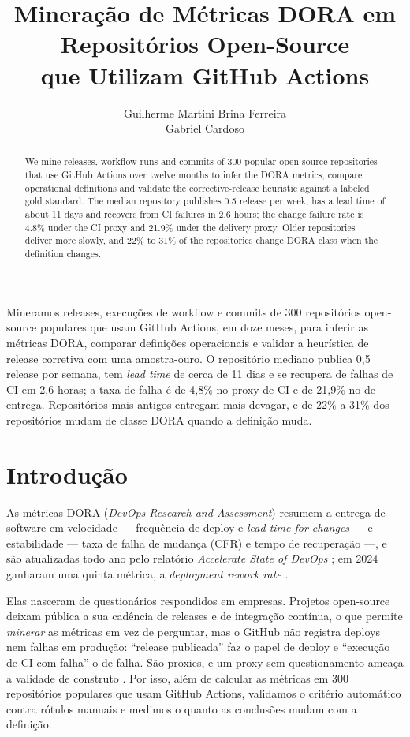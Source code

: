 \documentclass[12pt]{article}
\title{Mineração de Métricas DORA em Repositórios Open-Source\\ que Utilizam GitHub Actions}
\author{Guilherme Martini Brina Ferreira\inst{1}\\
        Gabriel Cardoso\inst{1}}
\begin{document}
\maketitle

\begin{abstract}
We mine releases, workflow runs and commits of 300 popular open-source
repositories that use GitHub Actions over twelve months to infer the DORA
metrics, compare operational definitions and validate the corrective-release
heuristic against a labeled gold standard. The median repository publishes 0.5
release per week, has a lead time of about 11 days and recovers from CI
failures in 2.6 hours; the change failure rate is 4.8\% under the CI proxy and
21.9\% under the delivery proxy. Older repositories deliver more slowly, and
22\% to 31\% of the repositories change DORA class when the definition changes.
\end{abstract}

\begin{resumo}
Mineramos releases, execuções de workflow e commits de 300 repositórios
open-source populares que usam GitHub Actions, em doze meses, para inferir as
métricas DORA, comparar definições operacionais e validar a heurística de
release corretiva com uma amostra-ouro. O repositório mediano publica 0,5
release por semana, tem \emph{lead time} de cerca de 11 dias e se recupera de
falhas de CI em 2,6 horas; a taxa de falha é de 4,8\% no proxy de CI e de
21,9\% no de entrega. Repositórios mais antigos entregam mais devagar, e de
22\% a 31\% dos repositórios mudam de classe DORA quando a definição muda.
\end{resumo}

\section{Introdução}

As métricas DORA (\emph{DevOps Research and Assessment}) resumem a entrega de
software em velocidade --- frequência de deploy e \emph{lead time for changes}
--- e estabilidade --- taxa de falha de mudança (CFR) e tempo de recuperação
\cite{forsgren2018,doraguide} ---, e são atualizadas todo ano pelo relatório
\emph{Accelerate State of DevOps} \cite{dorastate}; em 2024 ganharam uma quinta
métrica, a \emph{deployment rework rate} \cite{dorahistory}.

Elas nasceram de questionários respondidos em empresas. Projetos open-source
deixam pública a sua cadência de releases e de integração contínua, o que
permite \emph{minerar} as métricas em vez de perguntar, mas o GitHub não
registra deploys nem falhas em produção: ``release publicada'' faz o papel de
deploy e ``execução de CI com falha'' o de falha. São proxies, e um proxy sem
questionamento ameaça a validade de construto \cite{wohlin2012}. Por isso, além
de calcular as métricas em 300 repositórios populares que usam GitHub Actions,
validamos o critério automático contra rótulos manuais e medimos o quanto as
conclusões mudam com a definição.
\end{document}

